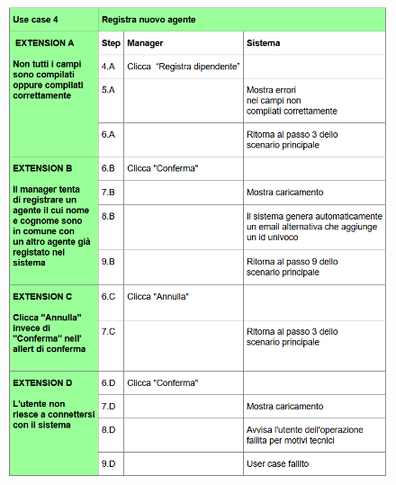 \begin{figure}[H]
	\centering
	\includegraphics[width=1\linewidth]{"Immagini/cockburn/registra nuovo agente Extensions.png"}
	\caption[CockBurn extensions: registra nuovo agente]{}
	\label{fig:registra-nuovo-agente-extensions}
\end{figure}
